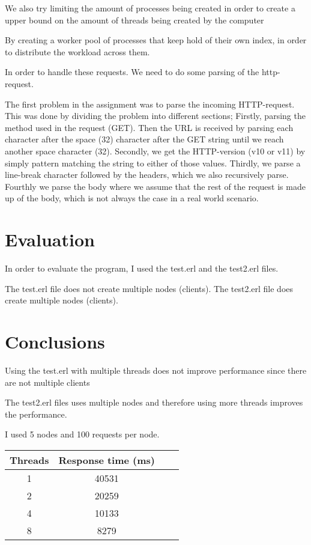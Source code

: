 \documentclass[a4paper, 11pt]{article}
\begin{document}
We also try limiting the amount of processes being created in order to create a upper bound on the amount of threads being created by the computer

By creating a worker pool of processes that keep hold of their own index, in order to distribute the workload across them.

In order to handle these requests. We need to do some parsing of the http-request.

The first problem in the assignment was to parse the incoming HTTP-request. This was done by dividing the problem into different sections;
Firstly, parsing the method used in the request (GET). Then the URL is received by parsing each character after the space (32) character after the GET string until we reach another space character (32).
Secondly, we get the HTTP-version (v10 or v11) by simply pattern matching the string to either of those values.
Thirdly, we parse a line-break character followed by the headers, which we also recursively parse.
Fourthly we parse the body where we assume that the rest of the request is made up of the body, which is not always the case in a real world scenario.

\section{Evaluation}

In order to evaluate the program, I used the test.erl and the test2.erl files.

The test.erl file does not create multiple nodes (clients).
The test2.erl file does create multiple nodes (clients).

\section{Conclusions}

Using the test.erl with multiple threads does not improve performance since there are not multiple clients

The test2.erl files uses multiple nodes and therefore using more threads improves the performance.

I used 5 nodes and 100 requests per node.

\begin{center}
  \begin{tabular}{||c c c c||} 
   \hline
   Threads & Response time (ms) \\ [0.5ex] 
   \hline\hline
   1 & 40531  \\ 
   \hline
   2 & 20259 \\
   \hline
   4 & 10133 \\
   \hline
   8 & 8279 \\ [1ex] 
   \hline
  \end{tabular}
  \end{center}
\end{document}
